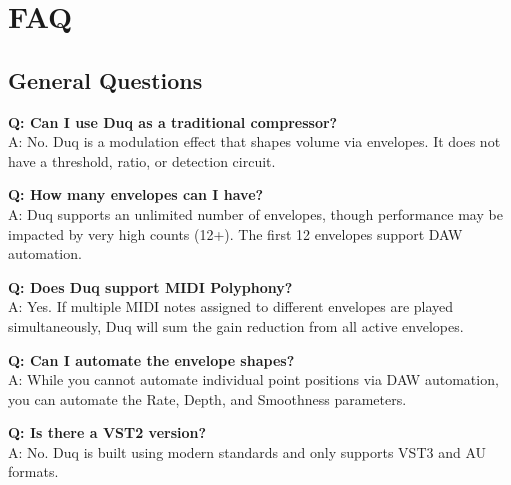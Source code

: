 \chapter{FAQ}
\label{ch:faq}

\section{General Questions}
\textbf{Q: Can I use Duq as a traditional compressor?} \\
A: No. Duq is a modulation effect that shapes volume via envelopes. It does not have a threshold, ratio, or detection circuit.

\textbf{Q: How many envelopes can I have?} \\
A: Duq supports an unlimited number of envelopes, though performance may be impacted by very high counts (12+). The first 12 envelopes support DAW automation.

\textbf{Q: Does Duq support MIDI Polyphony?} \\
A: Yes. If multiple MIDI notes assigned to different envelopes are played simultaneously, Duq will sum the gain reduction from all active envelopes.

\textbf{Q: Can I automate the envelope shapes?} \\
A: While you cannot automate individual point positions via DAW automation, you can automate the Rate, Depth, and Smoothness parameters.

\textbf{Q: Is there a VST2 version?} \\
A: No. Duq is built using modern standards and only supports VST3 and AU formats.
